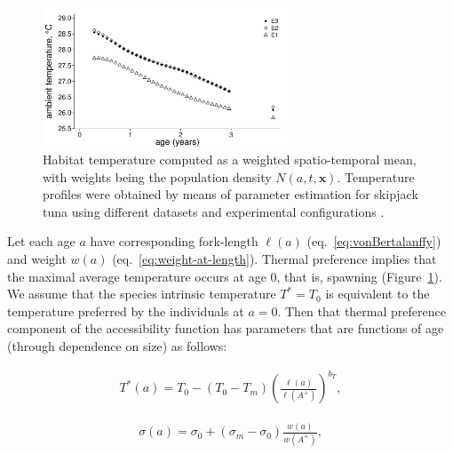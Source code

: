 \begin{figure}[htbp]
	\centering
        \includegraphics[width=0.65\textwidth]{chapter1/figs/mean_temperature}
	\caption{Habitat temperature computed as a weighted spatio-temporal mean, with weights being the population density $N(a,t,\mathbf{x})$. Temperature profiles were obtained by means of parameter estimation for skipjack tuna using different datasets and experimental configurations \citep*[see][for more details]{Senina2016}.}
	\label{fig:mean-temperature}
\end{figure}

Let each age $a$ have corresponding fork-length $\ell(a)$ (eq.~\ref{eq:vonBertalanffy}) and weight $w(a)$ (eq.~\ref{eq:weight-at-length}). Thermal preference implies that the maximal average temperature occurs at age 0, that is, spawning (Figure~\ref{fig:mean-temperature}). We  assume   that  the   species   intrinsic  temperature  $T^{*}=T_0$ is equivalent to  the temperature preferred by the individuals at $a=0$. Then that thermal preference component of the accessibility function has parameters that are functions of age (through dependence on size) as follows:

\begin{align}
  {T}^{*}(a) = T_0-(T_0-T_m){\left(\frac{\ell(a)}{\ell(A^{+})}\right)}^{b_T},
\label{eq:temperature-length}
\end{align} 

\begin{align}
  \sigma(a) = \sigma_0+(\sigma_m-\sigma_0)\frac{w(a)}{w(A^{+})},
\label{eq:sigma-weight}
\end{align} 

